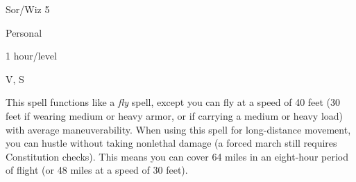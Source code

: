
\begin{description*}
\item[Level:] Sor/Wiz 5
\item[Range:] Personal
\item[Duration:] 1 hour/level
\item[Components:] V, S
\end{description*}

This spell functions like a \textit{fly} spell, except you can fly at a speed of
40 feet (30 feet if wearing medium or heavy armor, or if carrying a medium or heavy
load) with average maneuverability. When using this spell for long-distance movement,
you can hustle without taking nonlethal damage (a forced march still requires Constitution
checks). This means you can cover 64 miles in an eight-hour period of flight (or
48 miles at a speed of 30 feet).